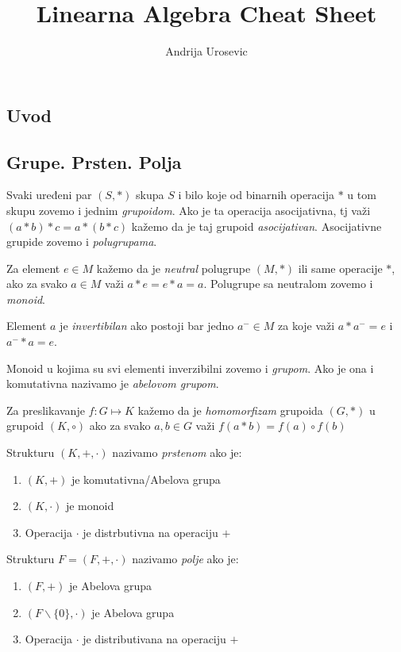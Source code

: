 \documentclass[12p,a4paper]{article}
\title{Linearna Algebra Cheat Sheet}
\author{Andrija Urosevic}
\begin{document}
\maketitle

\begin{multicols}{2}

\section{Uvod}

\subsection{Grupe. Prsten. Polja}

    Svaki uređeni par $(S, *)$ skupa $S$ i bilo koje od binarnih operacija $*$ 
    u tom skupu zovemo i jednim \textit{grupoidom}. Ako je ta operacija 
    asocijativna, tj važi $(a * b) * c = a * (b * c)$ kažemo da je taj grupoid 
    \textit{asocijativan}. Asocijativne grupide zovemo i \textit{polugrupama}.

    Za element $e \in M$ kažemo da je \textit{neutral} polugrupe $(M, *)$ ili 
    same operacije $*$, ako za svako $a \in M$ važi $a * e = e * a = a$. 
    Polugrupe sa neutralom zovemo i \textit{monoid}.

    Element $a$ je \textit{invertibilan} ako postoji bar jedno $a^- \in M$ za 
    koje važi $a * a^- = e$ i $a^- * a = e$.

    Monoid u kojima su svi elementi inverzibilni zovemo i \textit{grupom}. 
    Ako je ona i komutativna nazivamo je \textit{abelovom grupom}.

    Za preslikavanje $f : G \mapsto K$ kažemo da je \textit{homomorfizam} 
    grupoida $(G, *)$ u grupoid $(K, \circ)$ ako za svako $a, b \in G$ važi 
    $f(a * b) = f(a) \circ f(b)$

    Strukturu $(K, +, \cdot)$ nazivamo \textit{prstenom} ako je:
    \begin{enumerate}
        \itemsep0em
        \item $(K, +)$ je komutativna/Abelova grupa 
        \item $(K, \cdot)$ je monoid
        \item Operacija $\cdot$ je distrbutivna na operaciju $+$
    \end{enumerate}

    Strukturu $F = (F, +, \cdot)$ nazivamo \textit{polje} ako je:
    \begin{enumerate}
        \itemsep0em
        \item $(F, +)$ je Abelova grupa
        \item $(F \backslash \{0\}, \cdot)$ je Abelova grupa
        \item Operacija $\cdot$ je distributivana na operaciju $+$
    \end{enumerate}


\end{multicols}
\end{document}
